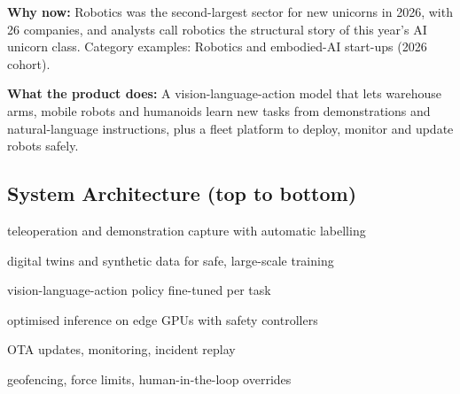 \documentclass[10pt,a4paper]{article}
\begin{document}
\begin{tcolorbox}[colback=l1bg,colframe=l1bg,arc=2pt,borderline west={3pt}{0pt}{saffron},top=2pt,bottom=2pt]\small\textbf{Why now:} Robotics was the second-largest sector for new unicorns in 2026, with 26 companies, and analysts call robotics the structural story of this year's AI unicorn class. {\color{muted}Category examples: Robotics and embodied-AI start-ups (2026 cohort).}\end{tcolorbox}
\begin{tcolorbox}[colback=l3bg,colframe=l3bg,arc=2pt,borderline west={3pt}{0pt}{igreen},top=2pt,bottom=2pt]\small\textbf{What the product does:} A vision-language-action model that lets warehouse arms, mobile robots and humanoids learn new tasks from demonstrations and natural-language instructions, plus a fleet platform to deploy, monitor and update robots safely.\end{tcolorbox}
\subsection*{System Architecture (top to bottom)}
\begin{tcolorbox}[colback=lay0,colframe=lay0,arc=2pt,top=1.5pt,bottom=1.5pt,left=6pt,before skip=2pt,after skip=2pt]\small{} teleoperation and demonstration capture with automatic labelling\end{tcolorbox}
\begin{tcolorbox}[colback=lay1,colframe=lay1,arc=2pt,top=1.5pt,bottom=1.5pt,left=6pt,before skip=2pt,after skip=2pt]\small{} digital twins and synthetic data for safe, large-scale training\end{tcolorbox}
\begin{tcolorbox}[colback=lay2,colframe=lay2,arc=2pt,top=1.5pt,bottom=1.5pt,left=6pt,before skip=2pt,after skip=2pt]\small{} vision-language-action policy fine-tuned per task\end{tcolorbox}
\begin{tcolorbox}[colback=lay3,colframe=lay3,arc=2pt,top=1.5pt,bottom=1.5pt,left=6pt,before skip=2pt,after skip=2pt]\small{} optimised inference on edge GPUs with safety controllers\end{tcolorbox}
\begin{tcolorbox}[colback=lay4,colframe=lay4,arc=2pt,top=1.5pt,bottom=1.5pt,left=6pt,before skip=2pt,after skip=2pt]\small{} OTA updates, monitoring, incident replay\end{tcolorbox}
\begin{tcolorbox}[colback=lay5,colframe=lay5,arc=2pt,top=1.5pt,bottom=1.5pt,left=6pt,before skip=2pt,after skip=2pt]\small{} geofencing, force limits, human-in-the-loop overrides\end{tcolorbox}
\end{document}
